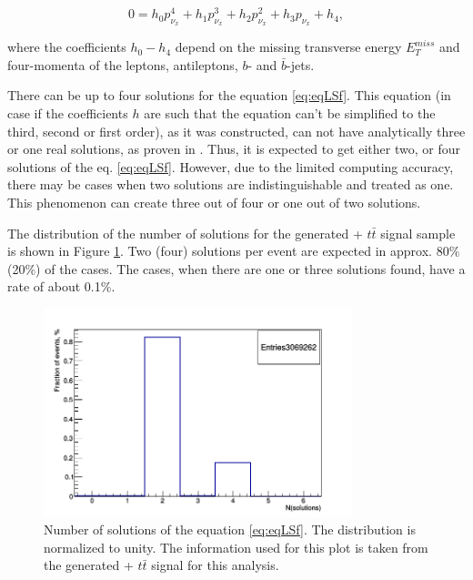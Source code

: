 \begin{equation}\label{eq:eqLSf}
 0 = h_{0} p_{\nu_{x}}^{4} + h_{1} p_{\nu_{x}}^{3} + h_{2} p_{\nu_{x}}^{2} + h_{3} p_{\nu_{x}} + h_{4},
\end{equation}

where the coefficients $h_{0} - h_{4}$ \cite{LSpaper, LSerrat} depend on the missing transverse energy $E_{T}^{miss}$ and four-momenta of the
leptons, antileptons, $b$- and $\bar{b}$-jets. 

There can be up to four solutions for the equation \ref{eq:eqLSf}. This equation (in case if the coefficients $h$ are such that the equation can't be simplified to the third, second
or first order), as it was constructed, can not have analytically three or one real solutions, as proven in \cite{LSpaper}. Thus, it is expected to get either two, or four solutions
of the eq. \ref{eq:eqLSf}. However, due to the limited computing accuracy, there may be cases when two solutions are indistinguishable and treated as one. This phenomenon can create
three out of four or one out of two solutions.

The distribution of the number of solutions for the generated \MG + \PYTHIA $t\bar{t}$ signal sample 
is shown in Figure \ref{fig:LSNsol}. Two (four) solutions per event are expected in approx. 80$\%$ (20\%) of the cases.
The cases, when there are one or three solutions found, have a rate of about 0.1\%.

\begin{figure}[t]
  \centering
  \includegraphics[width=0.8\textwidth]{05_kinReco/plots/KinReco_Nsolutions.png}
  \caption{Number of solutions of the equation \ref{eq:eqLSf}. The distribution is normalized to unity. The information used for this plot is taken
  from the generated \MG + \PYTHIA $t\bar{t}$ signal for this analysis.}
  \label{fig:LSNsol}
\end{figure}


